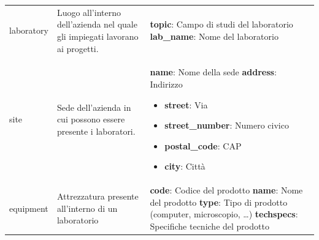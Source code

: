 \begin{longtable}{@{}| p{} | p{} | p{} |}
\begin{minipage}[t]{0.3\textwidth}
	                       \end{minipage}                              \\[175pt]
	\hline
	laboratory           & \begin{minipage}[t]{0.4\textwidth}
		                       \raggedright
		                       Luogo all'interno dell'azienda nel quale gli impiegati lavorano ai progetti.
	                       \end{minipage}
	                     & \begin{minipage}[t]{0.3\textwidth}
		                       \raggedright
		                       \textbf{topic}: Campo di studi del laboratorio\sskip
		                       \textbf{lab\_name}: Nome del laboratorio
	                       \end{minipage}                                                                \\[40pt]
	\hline
	site                 & \begin{minipage}[t]{0.4\textwidth}
		                       \raggedright
		                       Sede dell'azienda in cui possono essere presente i laboratori.
	                       \end{minipage}
	                     & \begin{minipage}[t]{0.3\textwidth}
		                       \raggedright
		                       \textbf{name}: Nome della sede\sskip
		                       \textbf{address}: Indirizzo
		                       \begin{itemize}
			\item \textbf{street}: Via
			\item \textbf{street\_number}: Numero civico
			\item \textbf{postal\_code}: CAP
			\item \textbf{city}: Città
		\end{itemize}
	                       \end{minipage}                                                                                \\[90pt]
	\hline
	equipment            & \begin{minipage}[t]{0.4\textwidth}
		                       \raggedright
		                       Attrezzatura presente all'interno di un laboratorio
	                       \end{minipage}
	                     & \begin{minipage}[t]{0.3\textwidth}
		                       \raggedright
		                       \textbf{code}: Codice del prodotto\sskip
		                       \textbf{name}: Nome del prodotto\sskip
		                       \textbf{type}: Tipo di prodotto (computer, microscopio, \dots)\sskip
		                       \textbf{techspecs}: Specifiche tecniche del prodotto
	                       \end{minipage}                                                \\[70pt]
	\hline
\end{longtable}

